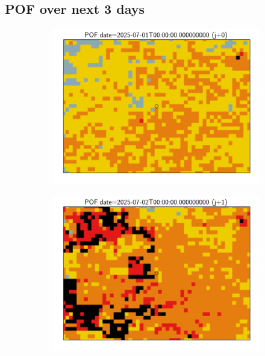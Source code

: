 \documentclass{article}
\begin{document}
\subsection*{POF over next 3 days}
\vspace{-1em}
\begin{figure}[H]
    \centering
    \begin{subfigure}[b]{0.31\textwidth}
        \centering
        \includegraphics[width=\linewidth]{pof_358_j0.png} %
    \end{subfigure}
    \begin{subfigure}[b]{0.31\textwidth}
        \centering
        \includegraphics[width=\linewidth]{pof_358_j1.png} %

\end{subfigure}
\end{figure}
\end{document}

